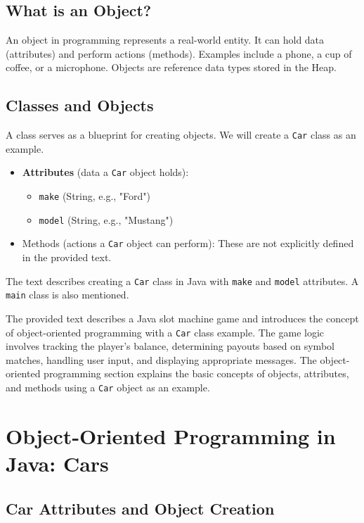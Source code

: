 \documentclass{article}
\begin{document}
\subsection{What is an Object?}

An object in programming represents a real-world entity.  It can hold data (attributes) and perform actions (methods).  Examples include a phone, a cup of coffee, or a microphone.  Objects are reference data types stored in the Heap.

\subsection{Classes and Objects}

A class serves as a blueprint for creating objects.  We will create a \texttt{Car} class as an example.

\begin{itemize}
    \item \textbf{Attributes} (data a \texttt{Car} object holds):
    \begin{itemize}
        \item \texttt{make} (String, e.g., "Ford")
        \item \texttt{model} (String, e.g., "Mustang")
    \end{itemize}
    \item Methods (actions a \texttt{Car} object can perform):  These are not explicitly defined in the provided text.
\end{itemize}

The text describes creating a \texttt{Car} class in Java with \texttt{make} and \texttt{model} attributes.  A \texttt{main} class is also mentioned.

The provided text describes a Java slot machine game and introduces the concept of object-oriented programming with a \texttt{Car} class example.  The game logic involves tracking the player's balance, determining payouts based on symbol matches, handling user input, and displaying appropriate messages.  The object-oriented programming section explains the basic concepts of objects, attributes, and methods using a \texttt{Car} object as an example.


\section{Object-Oriented Programming in Java: Cars}

\subsection{Car Attributes and Object Creation}
\end{document}
